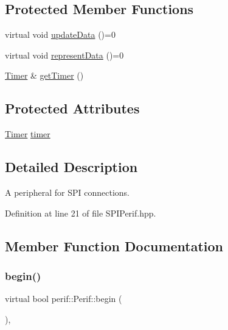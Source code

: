 \subsection*{Protected Member Functions}
\begin{DoxyCompactItemize}
\item 
virtual void \mbox{\hyperlink{classperif_1_1Perif_a7c9b9c1af5300dc5c007f9559fefbffe}{update\+Data}} ()=0
\item 
virtual void \mbox{\hyperlink{classperif_1_1Perif_a556c780e9e4623aa6b7c3d167ef23e6b}{represent\+Data}} ()=0
\item 
\mbox{\hyperlink{classTimer}{Timer}} \& \mbox{\hyperlink{classperif_1_1Perif_a29c48598a861d85256c30e28af67f864}{get\+Timer}} ()
\end{DoxyCompactItemize}
\subsection*{Protected Attributes}
\begin{DoxyCompactItemize}
\item 
\mbox{\hyperlink{classTimer}{Timer}} \mbox{\hyperlink{classperif_1_1Perif_acfa1256201bead82ccce1a0a8bcc24e1}{timer}}
\end{DoxyCompactItemize}


\subsection{Detailed Description}
A peripheral for S\+PI connections. 

Definition at line 21 of file S\+P\+I\+Perif.\+hpp.



\subsection{Member Function Documentation}
\mbox{\label{classperif_1_1Perif_ae7f1d1a4e9cd2343d51abc4ee21000cf}} 
\subsubsection{\texorpdfstring{begin()}{begin()}}
{\footnotesize\ttfamily virtual bool perif\+::\+Perif\+::begin (\begin{DoxyParamCaption}{ }\end{DoxyParamCaption})\hspace{0.3cm}{\ttfamily [pure virtual]}, {\ttfamily [inherited]}}

